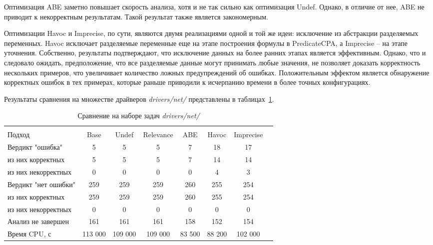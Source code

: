 Оптимизация ABE заметно повышает скорость анализа, хотя и не так сильно как оптимизация Undef. Однако, в отличие от нее, ABE не приводит к некорректным результатам. 
Такой результат также является закономерным.

Оптимизации Havoc и Imprecise, по сути, являются двумя реализациями одной и той же идеи: исключение из абстракции разделяемых переменных.
Havoc исключает разделяемые переменные еще на этапе построения формулы в PredicateCPA, а Imprecise -- на этапе уточнения.
Собственно, результаты подтверждают, что исключение данных на более ранних этапах является эффективным.
Однако, что и следовало ожидать, предположение, что все разделяемые данные могут принимать любые значения, не позволяет доказать корректность нескольких примеров, что увеличивает количество ложных предупреждений об ошибках.
Положительным эффектом является обнаружение корректных ошибок в тех примерах, которые раньше приводили к исчерпанию времени в более точных конфигурациях.

Результаты сравнения на множестве драйверов \textit{drivers/net/} представлены в таблицах~\ref{table-drivers-opt}.

  \begin{table}[h]\footnotesize \centering
    \caption{Сравнение на наборе задач \textit{drivers/net/}}
  	\label{table-drivers-opt}
    \begin{tabular}{ | l | c | c | c | c | c | c | c |}
      \hline
      		& 		\multicolumn{6}{c|}{\theoryraces}  \\
      Подход         				& Base 		& Undef		& Relevance & ABE 		& Havoc   	& Imprecise	\\ \hline
      Вердикт "ошибка" 				& 5  		& 5   		& 5       	& 7   		& 18     	& 17		\\ 
  \hspace{0.5cm} из них корректных 	& 5 		& 5 		& 5     	& 7   		& 14     	& 14 		\\ 
  \hspace{0.5cm} из них некорректных & 0 		& 0 		& 0     	& 0  		& 4      	& 3 		\\ \hline
      Вердикт "нет ошибки"  		& 259    	& 259    	& 259     	& 260   	& 255    	& 254		\\ 
  \hspace{0.5cm} из них корректных 	& 259 		& 259    	& 259       & 260   	& 255    	& 254    	\\
  \hspace{0.5cm} из них некорректных & 0 		& 0    		& 0      	& 0   		& 0     	& 0     	\\ \hline
      Анализ не завершен       		& 161    	& 161    	& 161     	& 158   	& 152    	& 154    	\\ \hline
      Время CPU, с   				& 113 000 	& 109 000 	& 109 000  	& 83 500   	& 88 200    & 102 000   \\ 
      \hline
    \end{tabular}
  \end{table}

